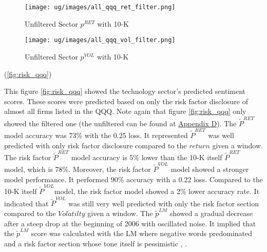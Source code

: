 \documentclass[logo,bsc,singlespacing,parskip]{infthesis}
\begin{document}
\begin{figure}[p]
  \centering
  \begin{minipage}{0.5\textwidth}
    \centering
    \texttt{[image: ug/images/all\_qqq\_ret\_filter.png]}
    \caption{\small Unfiltered Sector ${p}^{RET}$ with 10-K}
    \label{fig:all_qqq_ret_filter}
  \end{minipage}%
  \begin{minipage}{0.5\textwidth}
    \centering
    \texttt{[image: ug/images/all\_qqq\_vol\_filter.png]} 
    \caption{\small Unfiltered Sector ${p}^{VOL}$ with 10-K}
    \label{fig:all_qqq_vol_filter}
  \end{minipage}
\end{figure}

 (\ref{fig:risk_qqq})

This figure \ref{fig:risk_qqq} showed the technology sector’s predicted sentiment scores. These scores were predicted based on only the risk factor disclosure of almost all firms listed in the QQQ. Note again that figure \ref{fig:risk_qqq} only showed the filtered one (the unfiltered can be found at \hyperref[appendix_risk_qqq]{Appendix D}). The $\tilde{P}^{RET}$ model accuracy was 73\% with the 0.25  loss. It represented $\tilde{P}^{RET}$ was well predicted with only risk factor disclosure compared to the $return$ given a window. The risk factor $\tilde{P}^{RET}$ model accuracy is 5\% lower than the 10-K itself $\tilde{P}^{RET}$ model, which is 78\%. Moreover, the risk factor $\tilde{P}^{VOL}$ model showed a stronger model performance. It performed 90\% accuracy with a 0.22 loss. Compared to the 10-K itself $\tilde{P}^{VOL}$model, the risk factor model showed a 2\% lower accuracy rate. It indicated that $\tilde{P}^{VOL}$ was still very well predicted with only the risk factor section compared to the $Volatilty$  given a window. The $\tilde{p}^{LM}$ showed a gradual decrease after a steep drop at the beginning of 2006 with oscillated noise. It implied that the $\tilde{p}^{LM}$ score was calculated with the LM where negative words predominated and a risk factor section whose tone itself is pessimistic \cite{campbelletal2014a}, \cite{Filzen2015}.
\end{document}
